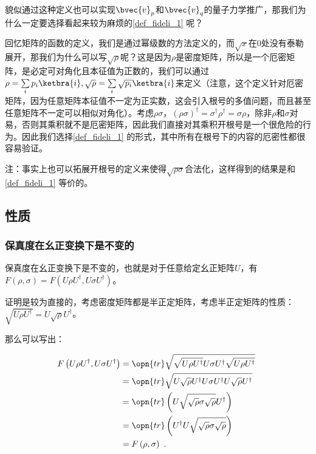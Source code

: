 貌似通过这种定义也可以实现$\bvec{v}_p$和$\bvec{v}_q$的量子力学推广，那我们为什么一定要选择看起来较为麻烦的\autoref{def_fideli_1} 呢？

回忆矩阵的函数的定义，我们是通过幂级数的方法定义的，而$\sqrt{x}$在$0$处没有泰勒展开，那我们为什么可以写$\sqrt{\rho}$呢？这是因为$\rho$是密度矩阵，所以是一个厄密矩阵，是必定可对角化且本征值为正数的，我们可以通过$\rho = \sum\limits_ip_i\ketbra{i},\sqrt{\rho} = \sum\limits_i\sqrt{p_i}\ketbra{i}$来定义（注意，这个定义针对厄密矩阵，因为任意矩阵本征值不一定为正实数，这会引入根号的多值问题，而且甚至任意矩阵不一定可以相似对角化）。考虑$\rho\sigma$，$\left(\rho\sigma\right)^\dagger = \sigma^\dagger \rho^\dagger = \sigma\rho$，除非$\rho$和$\sigma$对易，否则其乘积就不是厄密矩阵，因此我们直接对其乘积开根号是一个很危险的行为。因此我们选择\autoref{def_fideli_1} 的形式，其中所有在根号下的内容的厄密性都很容易验证。

注：事实上也可以拓展开根号的定义来使得$\sqrt{\rho\sigma}$合法化，这样得到的结果是和\autoref{def_fideli_1} 等价的。

\subsection{性质}

\subsubsection{保真度在幺正变换下是不变的}

保真度在幺正变换下是不变的，也就是对于任意给定幺正矩阵$U$，有$F\left(\rho,\sigma\right) = F\left(U \rho U^\dagger, U\sigma U^\dagger\right)$。

证明是较为直接的，考虑密度矩阵都是半正定矩阵，考虑半正定矩阵的性质：$\sqrt{U \rho U^\dagger} = U \sqrt{\rho} U^\dagger$。

那么可以写出：

\begin{equation}
\begin{aligned}
F\left(U \rho U^\dagger, U \sigma U^\dagger\right) &= \opn{tr}\sqrt{\sqrt{U \rho U^\dagger}U \sigma U^\dagger \sqrt{U \rho U^\dagger}} \\
&= \opn{tr}\sqrt{U\sqrt{\rho}U^\dagger U \sigma U^\dagger U \sqrt{\rho}U^\dagger} \\
&= \opn{tr}\left(U\sqrt{\sqrt{\rho}\sigma\sqrt{\rho}}U^\dagger\right) \\
&= \opn{tr}\left(U^\dagger U \sqrt{\sqrt{\rho}\sigma\sqrt{\rho}}\right) \\
&= F\left(\rho, \sigma\right)~.
\end{aligned}~
\end{equation}

